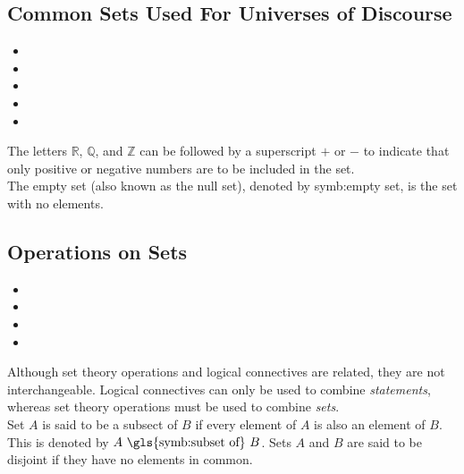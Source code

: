 \documentclass{article}
\begin{document}
\subsection{Common Sets Used For Universes of Discourse}
\begin{itemize}
    \item {}
    \item {}
    \item {}
    \item {}
    \item {}
\end{itemize}
The letters $\mathbb{R}$, $\mathbb{Q}$, and $\mathbb{Z}$ can be followed by a superscript $+$ or $-$ to indicate that only positive or negative numbers are to be included in the set.\\

\noindent The empty set (also known as the null set), denoted by \gls{symb:empty set}, is the set with no elements. 

\subsection{Operations on Sets}
\begin{itemize}
    \item {}
    \item {}
    \item {}
    \item {}
\end{itemize}
Although set theory operations and logical connectives are related, they are not interchangeable. Logical connectives can only be used to combine \textit{statements}, whereas set theory operations must be used to combine \textit{sets}.\\

\noindent Set $A$ is said to be a subsect of $B$ if every element of $A$ is also an element of $B$. This is denoted by $A \text{ \gls{symb:subset of} } B$. Sets $A$ and $B$ are said to be \gls{disjoint} if they have no elements in common.

\clearpage
\printglossary[type=\acronymtype,style=long]  %
\printglossary[type=symbolslist,style=long]   %
\printglossary[type=main]                     %
\end{document}
